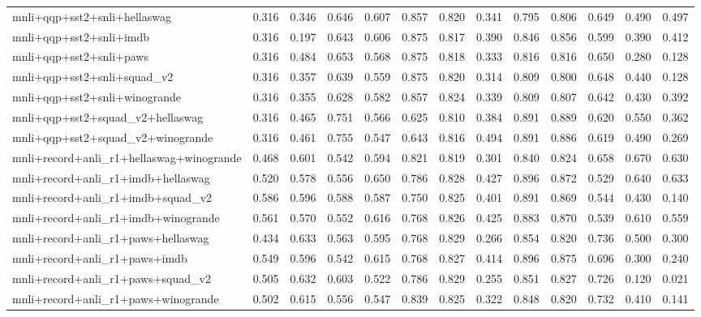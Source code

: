 \begin{table}[t]
\begin{tabular}{lrrrrrrrrrrrr}
    mnli+qqp+sst2+snli+hellaswag & 0.316 & 0.346 & 0.646 & 0.607 & 0.857 & 0.820 & 0.341 & 0.795 & 0.806 & 0.649 & 0.490 & 0.497 \\
    mnli+qqp+sst2+snli+imdb & 0.316 & 0.197 & 0.643 & 0.606 & 0.875 & 0.817 & 0.390 & 0.846 & 0.856 & 0.599 & 0.390 & 0.412 \\
    mnli+qqp+sst2+snli+paws & 0.316 & 0.484 & 0.653 & 0.568 & 0.875 & 0.818 & 0.333 & 0.816 & 0.816 & 0.650 & 0.280 & 0.128 \\
    mnli+qqp+sst2+snli+squad\_v2 & 0.316 & 0.357 & 0.639 & 0.559 & 0.875 & 0.820 & 0.314 & 0.809 & 0.800 & 0.648 & 0.440 & 0.128 \\
    mnli+qqp+sst2+snli+winogrande & 0.316 & 0.355 & 0.628 & 0.582 & 0.857 & 0.824 & 0.339 & 0.809 & 0.807 & 0.642 & 0.430 & 0.392 \\
    mnli+qqp+sst2+squad\_v2+hellaswag & 0.316 & 0.465 & 0.751 & 0.566 & 0.625 & 0.810 & 0.384 & 0.891 & 0.889 & 0.620 & 0.550 & 0.362 \\
    mnli+qqp+sst2+squad\_v2+winogrande & 0.316 & 0.461 & 0.755 & 0.547 & 0.643 & 0.816 & 0.494 & 0.891 & 0.886 & 0.619 & 0.490 & 0.269 \\
    mnli+record+anli\_r1+hellaswag+winogrande & 0.468 & 0.601 & 0.542 & 0.594 & 0.821 & 0.819 & 0.301 & 0.840 & 0.824 & 0.658 & 0.670 & 0.630 \\
    mnli+record+anli\_r1+imdb+hellaswag & 0.520 & 0.578 & 0.556 & 0.650 & 0.786 & 0.828 & 0.427 & 0.896 & 0.872 & 0.529 & 0.640 & 0.633 \\
    mnli+record+anli\_r1+imdb+squad\_v2 & 0.586 & 0.596 & 0.588 & 0.587 & 0.750 & 0.825 & 0.401 & 0.891 & 0.869 & 0.544 & 0.430 & 0.140 \\
    mnli+record+anli\_r1+imdb+winogrande & 0.561 & 0.570 & 0.552 & 0.616 & 0.768 & 0.826 & 0.425 & 0.883 & 0.870 & 0.539 & 0.610 & 0.559 \\
    mnli+record+anli\_r1+paws+hellaswag & 0.434 & 0.633 & 0.563 & 0.595 & 0.768 & 0.829 & 0.266 & 0.854 & 0.820 & 0.736 & 0.500 & 0.300 \\
    mnli+record+anli\_r1+paws+imdb & 0.549 & 0.596 & 0.542 & 0.615 & 0.768 & 0.827 & 0.414 & 0.896 & 0.875 & 0.696 & 0.300 & 0.240 \\
    mnli+record+anli\_r1+paws+squad\_v2 & 0.505 & 0.632 & 0.603 & 0.522 & 0.786 & 0.829 & 0.255 & 0.851 & 0.827 & 0.726 & 0.120 & 0.021 \\
    mnli+record+anli\_r1+paws+winogrande & 0.502 & 0.615 & 0.556 & 0.547 & 0.839 & 0.825 & 0.322 & 0.848 & 0.820 & 0.732 & 0.410 & 0.141 \\

\end{tabular}
\end{table}
